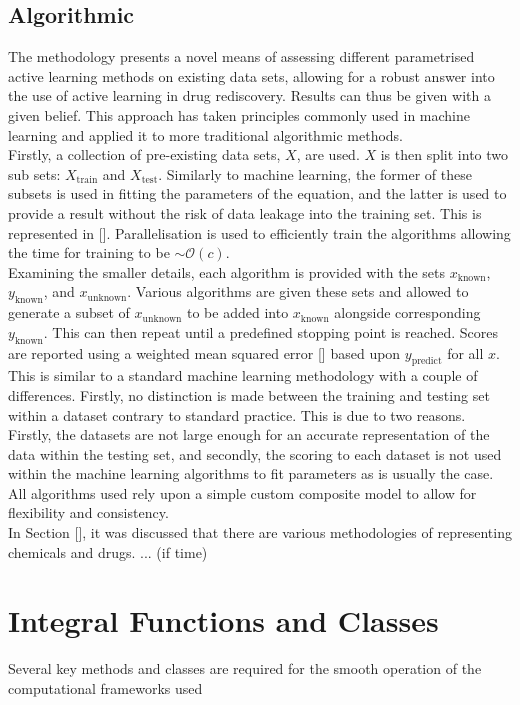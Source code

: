 \subsection{Algorithmic}
The methodology presents a novel means of assessing different parametrised active learning methods on existing data sets, allowing for a robust answer into the use of active learning in drug rediscovery. Results can thus be given with a given belief. This approach has taken principles commonly used in machine learning and applied it to more traditional algorithmic methods.
\\
Firstly, a collection of pre-existing data sets, $X$, are used. $X$ is then split into two sub sets: $X_{\mathrm{train}}$ and $X_\mathrm{test}$. Similarly to machine learning, the former of these subsets is used in fitting the parameters of the equation, and the latter is used to provide a result without the risk of data leakage into the training set. This is represented in []. Parallelisation is used to efficiently train the algorithms allowing the time for training to be $\sim{}\mathcal{O}(c)$.
\\
Examining the smaller details, each algorithm is provided with the sets $x_\mathrm{known}$, $y_\mathrm{known}$, and $x_\mathrm{unknown}$. Various algorithms are given these sets and allowed to generate a subset of $x_\mathrm{unknown}$ to be added into $x_\mathrm{known}$ alongside corresponding $y_\mathrm{known}$. This can then repeat until a predefined stopping point is reached. Scores are reported using a weighted mean squared error [] based upon $y_\mathrm{predict}$ for all $x$. This is similar to a standard machine learning methodology with a couple of differences. Firstly, no distinction is made between the training and testing set within a dataset contrary to standard practice. This is due to two reasons. Firstly, the datasets are not large enough for an accurate representation of the data within the testing set, and secondly, the scoring to each dataset is not used within the machine learning algorithms to fit parameters as is usually the case. All algorithms used rely upon a simple custom composite model to allow for flexibility and consistency.
\\
In Section [], it was discussed that there are various methodologies of representing chemicals and drugs. ... (if time)

\section{Integral Functions and Classes}
Several key methods and classes are required for the smooth operation of the computational frameworks used

